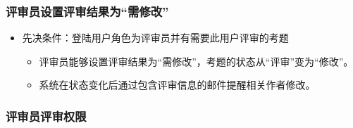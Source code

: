 \documentclass[hyperref, a4paper]{ctexart}
\providecommand{\tightlist}{%
  \setlength{\itemsep}{0pt}\setlength{\parskip}{0pt}}
\begin{document}
\hypertarget{ux8bc4ux5ba1ux5458ux8bbeux7f6eux8bc4ux5ba1ux7ed3ux679cux4e3aux9700ux4feeux6539}{%
\subsubsection{评审员设置评审结果为``需修改''}\label{ux8bc4ux5ba1ux5458ux8bbeux7f6eux8bc4ux5ba1ux7ed3ux679cux4e3aux9700ux4feeux6539}}

\begin{itemize}
\tightlist
\item
  先决条件：登陆用户角色为评审员并有需要此用户评审的考题

  \begin{itemize}
  \tightlist
  \item
    评审员能够设置评审结果为``需修改''，考题的状态从``评审''变为``修改''。
  \item
    系统在状态变化后通过包含评审信息的邮件提醒相关作者修改。
  \end{itemize}
\end{itemize}

\hypertarget{ux8bc4ux5ba1ux5458ux8bc4ux5ba1ux6743ux9650}{%
\subsubsection{评审员评审权限}\label{ux8bc4ux5ba1ux5458ux8bc4ux5ba1ux6743ux9650}}
\end{document}
